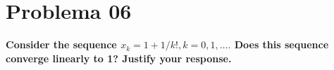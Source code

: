 \section*{Problema 06}

\textbf{Consider the sequence $x_k = 1 + 1/k!, k = 0, 1,\dots.$ Does this sequence converge linearly to 1? Justify your response.}
